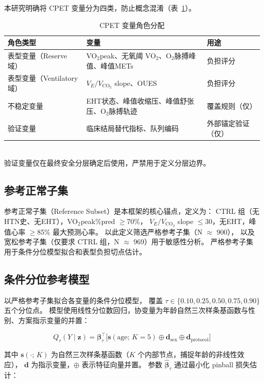 \documentclass[12pt, a4paper]{ctexart}
\begin{document}
本研究明确将 CPET 变量分为四类，防止概念混淆（表~\ref{tab:variable_roles}）。

\begin{table}[htbp]
\centering
\small
\caption{CPET 变量角色分配}
\label{tab:variable_roles}
\begin{tabular}{lll}
\toprule
角色类型 & 变量 & 用途 \\
\midrule
表型变量（Reserve 域）& VO$_2$peak、无氧阈 VO$_2$、O$_2$脉搏峰值、峰值METs & 负担评分 \\
表型变量（Ventilatory 域）& $V_E/V_{\text{CO}_2}$ slope、OUES & 负担评分 \\
不稳定变量 & EHT状态、峰值收缩压、峰值舒张压、O$_2$脉搏轨迹 & 覆盖规则（仅） \\
验证变量 & 临床结局替代指标、队列编码 & 外部锚定验证（仅） \\
\bottomrule
\end{tabular}
\\[1ex]
{\footnotesize 验证变量仅在最终安全分层确定后使用，严禁用于定义分层边界。}
\end{table}

\subsection{参考正常子集}

参考正常子集（Reference Subset）是本框架的核心锚点，定义为：
CTRL 组（无HTN史、无EHT），VO$_2$peak\%pred $\geq$70\%，
$V_E/V_{\text{CO}_2}$ slope $\leq$30，无EHT，峰值心率 $\geq$85\% 最大预测心率。
以此定义筛选严格参考子集（N $\approx$ 900），
以及宽松参考子集（仅要求 CTRL 组，N $\approx$ 969）用于敏感性分析。
严格参考子集用于条件分位模型拟合和表型负担切点估计。

\subsection{条件分位参考模型}

以严格参考子集拟合各变量的条件分位模型，
覆盖 $\tau \in \{0.10, 0.25, 0.50, 0.75, 0.90\}$ 五个分位点。
模型使用线性分位数回归，协变量为年龄自然三次样条基函数与性别、方案指示变量的并置：

\begin{equation}
\label{eq:quantile}
Q_\tau(Y \mid \mathbf{z}) = \boldsymbol{\beta}_\tau^\top
\bigl[\mathbf{s}(\text{age};\, K{=}5) \oplus \mathbf{d}_{\text{sex}}
\oplus \mathbf{d}_{\text{protocol}}\bigr]
\end{equation}

其中 $\mathbf{s}(\cdot;\, K)$ 为自然三次样条基函数（$K$ 个内部节点，捕捉年龄的非线性效应），
$\mathbf{d}$ 为指示变量，$\oplus$ 表示特征向量并置。
参数 $\hat{\boldsymbol{\beta}}_\tau$ 通过最小化 pinball 损失估计：
\end{document}
